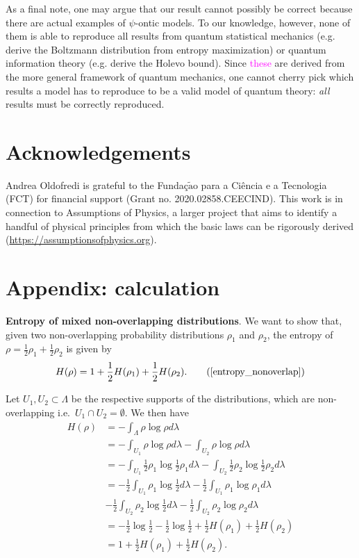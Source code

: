 \documentclass[10pt,twocolumn, nofootinbib]{revtex4-2}
\begin{document}
As a final note, one may argue that our result cannot possibly be correct because there are actual examples of $\psi$-ontic models. To our knowledge, however, none of them is able to reproduce all results from quantum statistical mechanics (e.g. derive the Boltzmann distribution from entropy maximization) or quantum information theory (e.g. derive the Holevo bound). Since \textcolor{magenta}{these} are derived from the more general framework of quantum mechanics, one cannot cherry pick which results a model has to reproduce to be a valid model of quantum theory: \emph{all} results must be correctly reproduced.


\section{Acknowledgements}

Andrea Oldofredi is grateful to the Funda\c{c}$\tilde{\mathrm{a}}$o para a Ci\^encia e a Tecnologia (FCT) for financial support (Grant no. 2020.02858.CEECIND).  This work is in connection to Assumptions of Physics, a larger project that aims to identify a handful of physical principles from which the basic laws can be rigorously derived  (\url{https://assumptionsofphysics.org}).


%

\clearpage

\section*{Appendix: calculation}
\label{A}
\textbf{Entropy of mixed non-overlapping distributions}. We want to show that, given two non-overlapping probability distributions $\rho_1$ and $\rho_2$, the entropy of $\rho = \frac{1}{2} \rho_1 + \frac{1}{2} \rho_2$ is given by
\begin{equation}
	H(\rho) = 1 + \frac{1}{2} H(\rho_1) + \frac{1}{2} H(\rho_2). \tag{\ref{entropy_nonoverlap}}
\end{equation}

Let $U_1, U_2 \subset \Lambda$ be the respective supports of the distributions, which are non-overlapping i.e.\ $U_1 \cap U_2 = \emptyset$. We then have
\begin{align*}
	H(\rho) &= - \int_\Lambda \rho \log \rho d\lambda \\
	&= -\int_{U_1} \rho \log \rho d\lambda -\int_{U_2} \rho \log \rho d\lambda \\
	&= -\int_{U_1} \frac{1}{2} \rho_1 \log \frac{1}{2} \rho_1 d\lambda -\int_{U_2} \frac{1}{2} \rho_2 \log \frac{1}{2} \rho_2 d\lambda \\
	&= - \frac{1}{2} \int_{U_1} \rho_1 \log \frac{1}{2} d\lambda - \frac{1}{2} \int_{U_1} \rho_1 \log \rho_1 d\lambda \\
	&- \frac{1}{2} \int_{U_2} \rho_2 \log \frac{1}{2} d\lambda - \frac{1}{2} \int_{U_2} \rho_2 \log \rho_2 d\lambda \\
	&= - \frac{1}{2} \log \frac{1}{2} - \frac{1}{2} \log \frac{1}{2} + \frac{1}{2} H(\rho_1) + \frac{1}{2} H(\rho_2) \\
	&= 1 + \frac{1}{2} H(\rho_1) + \frac{1}{2} H(\rho_2). \\
\end{align*}
\end{document}
